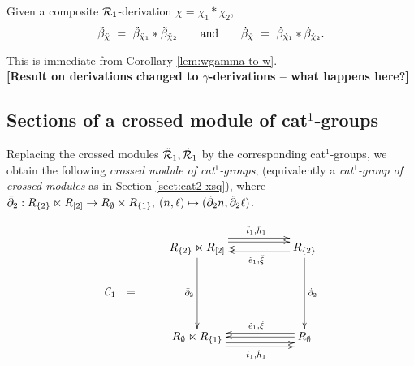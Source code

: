 \begin{lem}
Given a composite $\mathcal{R}_1$-derivation $\chi = \chi_1 * \chi_2$, 
$$
\ddot{\beta}_{\ddot{\chi}} ~=~ \ddot{\beta}_{\ddot{\chi}_1} * \ddot{\beta}_{\ddot{\chi}_2} 
\qquad \mbox{and} \qquad
 \dot{\beta}_{\dot{\chi}}  ~=~ \dot{\beta}_{\dot{\chi}_1} * \dot{\beta}_{\dot{\chi}_2}.
$$
\end{lem}
\begin{pf}
This is immediate from Corollary \ref{lem:wgamma-to-w}. \\

\bigskip
\noindent 
{\bf [Result on derivations changed to $\gamma$-derivations 
-- what happens here?]}
\end{pf}


\bigskip
\subsection{Sections of a crossed module of cat$^1$-groups}

Replacing the crossed modules $\ddot{\mathcal{R}}_1, \dot{\mathcal{R}}_1$  by the corresponding
cat$^1$-groups, we obtain the following 
\emph{crossed module of cat$^1$-groups},
(equivalently a \emph{cat$^1$-group of crossed modules} 
as in Section \ref{sect:cat2-xsq}), where
$\bar{\partial}_2 : 
 R_{\{2\}} \ltimes R_{[2]} \to R_{\emptyset} \ltimes R_{\{1\}}, \: 
 (n, \ell) \mapsto (\dot{\partial}_2 n, \ddot{\partial}_2 \ell)$.

\begin{equation} 
\vcenter{\xymatrix{
 & R_{\{2\}} \ltimes R_{[2]} \ar[dd]_{\barbdyt}
     \ar[rr] <+1.2ex>  \ar[rr] <+2.0ex> ^(0.55){\ddtto,\ddhho}
     &&  R_{\{2\}}   \ar[dd]^{\dbdyt}  
             \ar[ll] \ar[ll] <+0.8ex> ^(0.45){\ddeeo,\ddx} \\
\calC_1 ~~=
 &   &&   \\
 & R_{\emptyset} \ltimes R_{\{1\}}  
     \ar[rr] <-1.2ex>  \ar[rr] <-2.0ex> _(0.55){\dtto,\dhho}
     &&  R_{\emptyset} \ar[ll]  \ar[ll] <-0.8ex> _(0.45){\deeo,\dx} 
 \\
}}
\end{equation}

